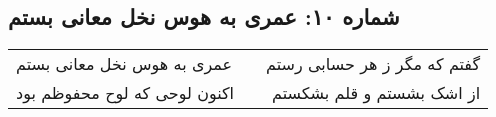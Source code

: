 \begin{center}
\section*{شماره ۱۰: عمری به هوس نخل معانی بستم}
\label{sec:010}
\begin{longtable}{l p{0.5cm} r}
عمری به هوس نخل معانی بستم
&&
گفتم که مگر ز هر حسابی رستم
\\
اکنون لوحی که لوح محفوظم بود
&&
از اشک بشستم و قلم بشکستم
\\
\end{longtable}
\end{center}
